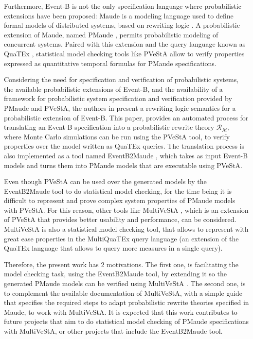 Furthermore, Event-B is not the only specification language where probabilistic extensions have been proposed: Maude \cite{Clavel2007} is a modeling language used to define formal models of distributed systems, based on rewriting logic \cite{Bruni2006}. A probabilistic extension of Maude, named PMaude \cite{Agha2006}, permits probabilistic modeling of concurrent systems. Paired with this extension and the query language known as QuaTEx \cite{Agha2006}, statistical model checking tools like PVeStA \cite{AlTurki2011} allow to verify properties expressed as quantitative temporal formulas for PMaude specifications.

Considering the need for specification and verification of probabilistic systems, the available probabilistic extensions of Event-B, and the availability of a framework for probabilistic system specification and verification provided by PMaude and PVeStA,  the authors in \cite{Olarte} present a rewriting logic semantics for a probabilistic extension of Event-B. This paper, provides an automated process for translating an Event-B specification into a probabilistic rewrite theory $\mathscr{R}_\mathscr{M}$, where Monte Carlo simulations can be run using the PVeStA tool, to verify properties over the model written as QuaTEx queries. The translation process is also implemented as a tool named EventB2Maude \cite{tool.website}, which takes as input Event-B models and turns them into PMaude models that are executable using PVeStA.

Even though PVeStA can be used over the generated models by the EventB2Maude tool to do statistical model checking, for the time being it is difficult to represent and prove complex system properties of PMaude models with PVeStA. For this reason, other tools like MultiVeStA \cite{multivesta}, which is an extension of PVeStA that provides better usability and performance, can be considered. MultiVeStA is also a statistical model checking tool, that allows to represent with great ease properties in the MultiQuaTEx query language \cite{multivesta} (an extension of the QuaTEx language that allows to query more measures in a single query). 

Therefore, the present work has 2 motivations. The first one, is facilitating the model checking task, using the EventB2Maude tool, by extending it so the generated PMaude models can be verified using MultiVeStA . The second one, is to complement the available documentation of MultiVeStA, with a simple guide that specifies the required steps to adapt probabilistic rewrite theories specified in Maude, to work with MultiVeStA. It is expected that this work contributes to future projects that aim to do statistical model checking of PMaude specifications with MultiVeStA, or other projects that include the EventB2Maude tool.


